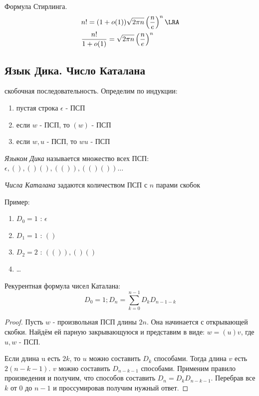 \documentclass[a4paper, 14pt]{article}
\begin{document}
    \begin{theorem}
        Формула Стирлинга. 
        \begin{align*}
            &n! = (1 + o(1))\sqrt{2\pi n}\left(\frac{n}{e}\right)^n \LRA \\
            &\frac{n!}{1+o(1)} = \sqrt{2\pi n}\left(\frac{n}{e}\right)^n
        \end{align*}
    \end{theorem}

    \subsection*{Язык Дика. Число Каталана}

    \begin{definition}
        { скобочная последовательность}. Определим по индукции:
        \begin{enumerate}
            \item пустая строка $\epsilon$ - ПСП
            \item если $w$ - ПСП, то $(w)$ - ПСП
            \item если $w, u$ - ПСП, то $wu$ - ПСП
        \end{enumerate}
    \end{definition}

    \begin{definition}
        {\it Языком Дика} называется множество всех ПСП:
        $\epsilon, (), ()(), (()), (()()) \dots$
    \end{definition}

    \begin{definition}
        {\it Числа Каталана} задаются количеством ПСП с $n$ парами скобок    
    \end{definition}
    Пример:
    \begin{enumerate}
        \item $D_0 = 1$ : $\epsilon$
        \item $D_1 = 1$ : $()$
        \item $D_2 = 2$ : $(()), ()()$
        \item \dots
    \end{enumerate}
    
    \begin{theorem}
        Рекурентная формула чисел Каталана:
        \[D_0 = 1; D_n = \sum_{k=0}^{n-1}D_kD_{n-1-k}\]
    \end{theorem}
    \begin{proof}
        Пусть $w$ - произвольная ПСП длины $2n$. Она начинается
        с открывающей скобки. Найдём ей парную закрывающуюся и представим 
        в виде: $w = (u)v$, где $u, w$ - ПСП.
        
        Если длина u есть $2k$, то $u$ можно составить $D_k$ способами.
        Тогда длина $v$ есть $2(n-k-1)$.   $v$ можно составить $D_{n-k-1}$ способами.
        Применим правило произведения и получим, что способов составить $D_n = D_kD_{n-k-1}$.
        Перебрав все $k$ от $0$ до $n-1$ и проссумировав получим нужный ответ.
    \end{proof}
\end{document}
